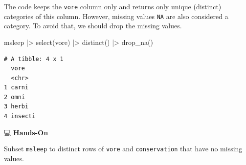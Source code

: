 \documentclass[
  letterpaper,
  DIV=11,
  numbers=noendperiod]{scrreprt}
\newenvironment{Shaded}{\begin{snugshade}}{\end{snugshade}}
\newcommand{\FunctionTok}[1]{\textcolor[rgb]{0.28,0.35,0.67}{#1}}
\newcommand{\NormalTok}[1]{\textcolor[rgb]{0.00,0.23,0.31}{#1}}
\newcommand{\SpecialCharTok}[1]{\textcolor[rgb]{0.37,0.37,0.37}{#1}}
\begin{document}
\begin{tcolorbox}[enhanced jigsaw, colbacktitle=quarto-callout-tip-color!10!white, opacitybacktitle=0.6, breakable, left=2mm, leftrule=.75mm, toprule=.15mm, toptitle=1mm, bottomtitle=1mm, colframe=quarto-callout-tip-color-frame, opacityback=0, coltitle=black, arc=.35mm, titlerule=0mm, colback=white, bottomrule=.15mm, title=\textcolor{quarto-callout-tip-color}{\faLightbulb}\hspace{0.5em}{Answer}, rightrule=.15mm]

The code keeps the \texttt{vore} column only and returns only unique
(distinct) categories of this column. However, missing values
\texttt{NA} are also considered a category. To avoid that, we should
drop the missing values.

\begin{Shaded}
\begin{Highlighting}[]
\NormalTok{msleep }\SpecialCharTok{|\textgreater{}}
  \FunctionTok{select}\NormalTok{(vore) }\SpecialCharTok{|\textgreater{}}
  \FunctionTok{distinct}\NormalTok{() }\SpecialCharTok{|\textgreater{}}
  \FunctionTok{drop\_na}\NormalTok{()}
\end{Highlighting}
\end{Shaded}

\begin{verbatim}
# A tibble: 4 x 1
  vore   
  <chr>  
1 carni  
2 omni   
3 herbi  
4 insecti
\end{verbatim}

\end{tcolorbox}

💻 \textbf{Hands-On}

Subset \texttt{msleep} to distinct rows of \texttt{vore} and
\texttt{conservation} that have no missing values.
\end{document}
